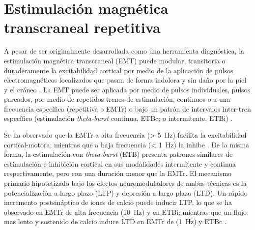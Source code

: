 \section{Estimulación magnética transcraneal repetitiva}
A pesar de ser originalmente desarrollada como una herramienta diagnóstica, la estimulación magnética transcraneal (EMT) puede modular, transitoria o duraderamente la excitabilidad cortical por medio de la aplicación de pulsos electromagnéticos localizados que pasan de forma indolora y sin daño por la piel y el cráneo \parencite{Horvath2011a, Noohi2016}.
La EMT puede ser aplicada por medio de pulsos individuales, pulsos pareados, por medio de repetidos trenes de estimulación, continuos o a una frecuencia específica (repetitiva o EMTr) o bajo un patrón de intervalos inter-tren específico (estimulación \textit{theta-burst} continua, ETBc; o intermitente, ETBi) \parencite{Ekhtiari2019}. \par
Se ha observado que la EMTr a alta frecuencia (\deactivatequoting\SI{> 5}{\hertz}\activatequoting) facilita la excitabilidad cortical-motora, mientras que a baja frecuencia (\deactivatequoting\SI{< 1}{\hertz}\activatequoting) la inhibe \parencite{Pascual-Leone1994}.
De la misma forma, la estimulación con \textit{theta-burst} (ETB) presenta patrones similares de estimulación e inhibición cortical en sus modalidades intermitente y continua respectivamente, pero con una duración menor que la EMTr. El mecanismo primario hipotetizado bajo los efectos neuromoduladores de ambas técnicas es la potencialización a largo plazo (LTP) y depresión a largo plazo (LTD).
Un rápido incremento postsináptico de iones de calcio puede inducir LTP, lo que se ha observado en EMTr de alta frecuencia (\SI{10}{\hertz}) y en ETBi; mientras que un flujo mas lento y sostenido de calcio induce LTD en EMTr de (\SI{1}{\hertz}) y ETBc \parencite{Ekhtiari2019}.


